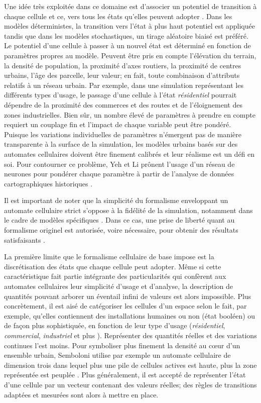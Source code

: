 \documentclass[10pt]{article}
\begin{document}
Une idée très exploitée dans ce domaine est d'associer un potentiel de
transition à chaque cellule et ce, vers tous les états qu'elles
peuvent adopter \cite{Benenson2004}. Dans les modèles déterministes,
la transition vers l'état à plus haut potentiel est appliquée tandis
que dans les modèles stochastiques, un tirage aléatoire biaisé est
préféré. Le potentiel d'une cellule à passer à un nouvel état est
déterminé en fonction de paramètres propres au modèle. Peuvent être
pris en compte l'élévation du terrain, la densité de population, la
proximité d'axes routiers, la proximité de centres urbains, l'âge des
parcelle, leur valeur; en fait, toute combinaison d'attributs relatifs
à un réseau urbain. Par exemple, dans une simulation représentant les
différents types d'usage, le passage d'une cellule à l'état
\textit{résidentiel} pourrait dépendre de la proximité des commerces
et des routes et de l'éloignement des zones industrielles. Bien sûr,
un nombre élevé de paramètres à prendre en compte requiert un couplage
fin et l'impact de chaque variable peut être pondéré. Puisque les
variations individuelles de paramètres n'émergent pas de manière
transparente à la surface de la simulation, les modèles urbains basés
sur des automates cellulaires doivent être finement calibrés et leur
réalisme est un défi en soi. Pour contourner ce problème, Yeh et Li
prônent l'usage d'un réseau de neurones pour pondérer chaque paramètre
à partir de l'analyse de données cartographiques historiques
\cite{Yeh2002}.

Il est important de noter que la simplicité du formalisme enveloppant
un automate cellulaire strict s'oppose à la fidélité de la simulation,
notamment dans le cadre de modèles spécifiques
\cite{Torrens2000,Torrens2001}. Dans ce cas, une prise de liberté
quant au formalisme originel est autorisée, voire nécessaire, pour
obtenir des résultats satisfaisants \cite{White1998}.

La première limite que le formalisme cellulaire de base impose est la
discrétisation des états que chaque cellule peut adopter. Même si
cette caractéristique fait partie intégrante des particularités qui
confèrent aux automates cellulaires leur simplicité d'usage et
d'analyse, la description de quantités pouvant arborer un éventail
infini de valeurs est alors impossible. Plus concrètement, il est aisé
de catégoriser les cellules d'un espace selon le fait, par exemple,
qu'elles contiennent des installations humaines ou non (état booléen)
\cite{Benguigui2004,Cornu2008} ou de façon plus sophistiquée, en
fonction de leur type d'usage (\textit{résidentiel},
\textit{commercial}, \textit{industriel} \cite{Lechner} et plus
\cite{Dubos-Paillard2003}). Représenter des quantités réelles et des
variations continues l'est moins. Pour symboliser plus finement la
densité au c\oe ur d'un ensemble urbain, Semboloni utilise par exemple
un automate cellulaire de dimension trois dans lequel plus une pile de
cellules actives est haute, plus la zone représentée est peuplée
\cite{Semboloni2000}. Plus généralement, il est accepté de représenter
l'état d'une cellule par un vecteur contenant des valeurs réelles; des
règles de transitions adaptées et mesurées sont alors à mettre en
place.
\end{document}
